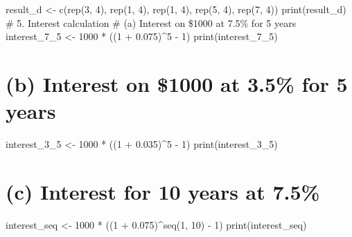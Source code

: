 \documentclass[
]{article}
\begin{document}
result\_d \textless- c(rep(3, 4), rep(1, 4), rep(1, 4), rep(5, 4),
rep(7, 4)) print(result\_d) \# 5. Interest calculation \# (a) Interest
on \$1000 at 7.5\% for 5 years interest\_7\_5 \textless- 1000 * ((1 +
0.075)\^{}5 - 1) print(interest\_7\_5)

\section{(b) Interest on \$1000 at 3.5\% for 5
years}\label{b-interest-on-1000-at-3.5-for-5-years}

interest\_3\_5 \textless- 1000 * ((1 + 0.035)\^{}5 - 1)
print(interest\_3\_5)

\section{(c) Interest for 10 years at
7.5\%}\label{c-interest-for-10-years-at-7.5}

interest\_seq \textless- 1000 * ((1 + 0.075)\^{}seq(1, 10) - 1)
print(interest\_seq)
\end{document}
